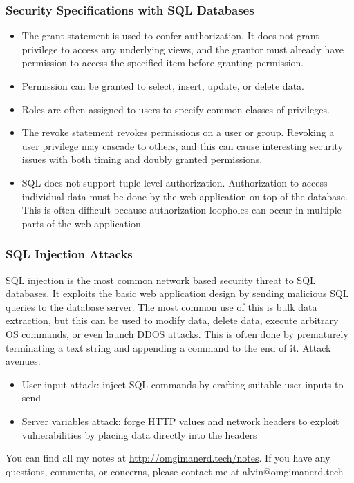 \documentclass{math}
\begin{document}
\subsubsection*{Security Specifications with SQL Databases}
\begin{itemize}
  \item The grant statement is used to confer authorization. It does not grant
  privilege to access any underlying views, and the grantor must already have
  permission to access the specified item before granting permission.
  \item Permission can be granted to select, insert, update, or delete data.
  \item Roles are often assigned to users to specify common classes of
  privileges.
  \item The revoke statement revokes permissions on a user or group. Revoking
  a user privilege may cascade to others, and this can cause interesting
  security issues with both timing and doubly granted permissions.
  \item SQL does not support tuple level authorization. Authorization to access
  individual data must be done by the web application on top of the database.
  This is often difficult because authorization loopholes can occur in multiple
  parts of the web application.
\end{itemize}

\subsubsection*{SQL Injection Attacks}
SQL injection is the most common network based security threat to SQL databases.
It exploits the basic web application design by sending malicious SQL queries to
the database server. The most common use of this is bulk data extraction, but
this can be used to modify data, delete data, execute arbitrary OS commands, or
even launch DDOS attacks. This is often done by prematurely terminating a text
string and appending a command to the end of it. Attack avenues:
\begin{itemize}
  \item User input attack: inject SQL commands by crafting suitable user inputs
  to send
  \item Server variables attack: forge HTTP values and network headers to
  exploit vulnerabilities by placing data directly into the headers
\end{itemize}

\begin{center}
  You can find all my notes at \url{http://omgimanerd.tech/notes}. If you have
  any questions, comments, or concerns, please contact me at
  alvin@omgimanerd.tech
\end{center}
\end{document}

